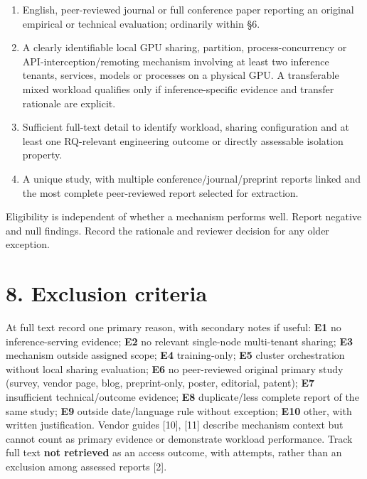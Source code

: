 \documentclass[
  12pt,
]{article}
\providecommand{\tightlist}{%
  \setlength{\itemsep}{0pt}\setlength{\parskip}{0pt}}
\begin{document}
\begin{enumerate}
\def\labelenumi{\arabic{enumi}.}
\tightlist
\item
  English, peer-reviewed journal or full conference paper reporting an
  original empirical or technical evaluation; ordinarily within §6.
\item
  A clearly identifiable local GPU sharing, partition,
  process-concurrency or API-interception/remoting mechanism involving
  at least two inference tenants, services, models or processes on a
  physical GPU. A transferable mixed workload qualifies only if
  inference-specific evidence and transfer rationale are explicit.
\item
  Sufficient full-text detail to identify workload, sharing
  configuration and at least one RQ-relevant engineering outcome or
  directly assessable isolation property.
\item
  A unique study, with multiple conference/journal/preprint reports
  linked and the most complete peer-reviewed report selected for
  extraction.
\end{enumerate}

Eligibility is independent of whether a mechanism performs well. Report
negative and null findings. Record the rationale and reviewer decision
for any older exception.

\hypertarget{8-exclusion-criteria}{%
\section{8. Exclusion criteria}\label{8-exclusion-criteria}}

At full text record one primary reason, with secondary notes if useful:
\textbf{E1} no inference-serving evidence; \textbf{E2} no relevant
single-node multi-tenant sharing; \textbf{E3} mechanism outside assigned
scope; \textbf{E4} training-only; \textbf{E5} cluster orchestration
without local sharing evaluation; \textbf{E6} no peer-reviewed original
primary study (survey, vendor page, blog, preprint-only, poster,
editorial, patent); \textbf{E7} insufficient technical/outcome evidence;
\textbf{E8} duplicate/less complete report of the same study;
\textbf{E9} outside date/language rule without exception; \textbf{E10}
other, with written justification. Vendor guides {[}10{]}, {[}11{]}
describe mechanism context but cannot count as primary evidence or
demonstrate workload performance. Track full text \textbf{not retrieved}
as an access outcome, with attempts, rather than an exclusion among
assessed reports {[}2{]}.
\end{document}
